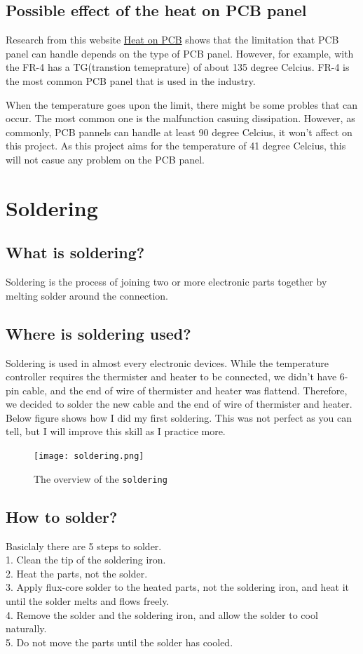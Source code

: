 \documentclass{article}
\begin{document}
\subsection{Possible effect of the heat on PCB panel}
Research from this website \href{https://www.mclpcb.com/blog/pcb-temperature/#:~:text=One%20common%20cause%20of%20high,to%20the%20risk%20of%20overheating.}
{Heat on PCB} shows that the limitation that PCB panel can handle depends on the type of PCB panel.
However, for example, with the FR-4 has a TG(transtion temeprature) of about 135 degree Celcius. 
FR-4 is the most common PCB panel that is used in the industry.

When the temperature goes upon the limit, there might be some probles that can occur.
The most common one is the malfunction casuing dissipation. 
However, as commonly, PCB pannels can handle at least 90 degree Celcius, it won't affect on this project.
As this project aims for the temperature of 41 degree Celcius, this will not casue any problem on the PCB panel.

\section{Soldering}
\subsection{What is soldering?}
Soldering is the process of joining two or more electronic parts together by melting solder around the connection.
\subsection{Where is soldering used?}
Soldering is used in almost every electronic devices. 
While the temperature controller requires the thermister and heater to be connected, 
we didn't have 6-pin cable, and the end of wire of thermister and heater was flattend. 
Therefore, we decided to solder the new cable and the end of wire of thermister and heater.
Below figure shows how I did my first soldering. 
This was not perfect as you can tell, but I will improve this skill as I practice more.
\begin{figure}[htpb]
    \centering
    \texttt{[image: soldering.png]}
    \caption{The overview of the \texttt{soldering}}
    \label{fig:s_r}
\end{figure}
\subsection{How to solder?}
Basiclaly there are 5 steps to solder. \\
1. Clean the tip of the soldering iron. \\
2. Heat the parts, not the solder. \\
3. Apply flux-core solder to the heated parts, not the soldering iron, and heat it until the solder melts and flows freely. \\
4. Remove the solder and the soldering iron, and allow the solder to cool naturally. \\
5. Do not move the parts until the solder has cooled. \\
\end{document}
